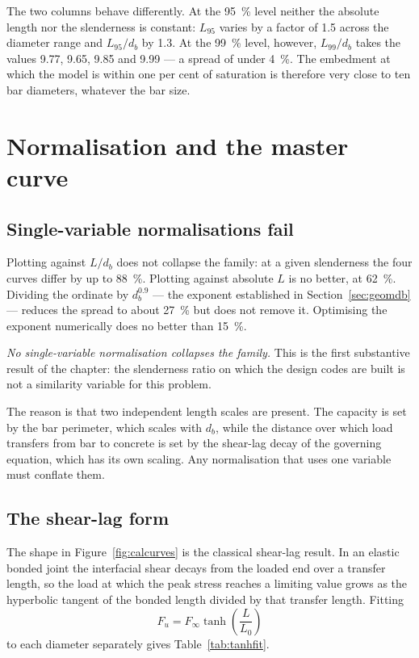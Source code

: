 The two columns behave differently. At the \SI{95}{\percent} level neither
the absolute length nor the slenderness is constant: $L_{95}$ varies by a
factor of \num{1.5} across the diameter range and $L_{95}/d_b$ by
\num{1.3}. At the \SI{99}{\percent} level, however, $L_{99}/d_b$ takes the
values \num{9.77}, \num{9.65}, \num{9.85} and \num{9.99} --- a spread of
under \SI{4}{\percent}. The embedment at which the model is within one per
cent of saturation is therefore very close to ten bar diameters, whatever
the bar size.


\section{Normalisation and the master curve}
\label{sec:masterfit}

\subsection{Single-variable normalisations fail}

Plotting against $L/d_b$ does not collapse the family: at a given
slenderness the four curves differ by up to \SI{88}{\percent}. Plotting
against absolute $L$ is no better, at \SI{62}{\percent}. Dividing the
ordinate by $d_b^{0.9}$ --- the exponent established in
Section~\ref{sec:geomdb} --- reduces the spread to about \SI{27}{\percent}
but does not remove it. Optimising the exponent numerically does no better
than \SI{15}{\percent}.

\emph{No single-variable normalisation collapses the family.} This is the
first substantive result of the chapter: the slenderness ratio on which the
design codes are built is not a similarity variable for this problem.

The reason is that two independent length scales are present. The capacity
is set by the bar perimeter, which scales with $d_b$, while the distance
over which load transfers from bar to concrete is set by the shear-lag decay
of the governing equation, which has its own scaling. Any normalisation that
uses one variable must conflate them.

\subsection{The shear-lag form}

The shape in Figure~\ref{fig:calcurves} is the classical shear-lag result.
In an elastic bonded joint the interfacial shear decays from the loaded end
over a transfer length, so the load at which the peak stress reaches a
limiting value grows as the hyperbolic tangent of the bonded length divided
by that transfer length. Fitting
\begin{equation}
\label{eq:tanhfit}
F_u = F_\infty \tanh\!\left(\frac{L}{L_0}\right)
\end{equation}
to each diameter separately gives Table~\ref{tab:tanhfit}.

